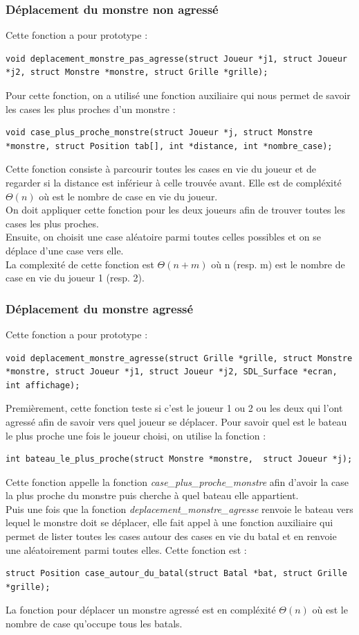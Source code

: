\subsubsection{Déplacement du monstre non agressé}
Cette fonction a pour prototype :
\begin{lstlisting}
void deplacement_monstre_pas_agresse(struct Joueur *j1, struct Joueur *j2, struct Monstre *monstre, struct Grille *grille);
\end{lstlisting}
Pour cette fonction, on a utilisé une fonction auxiliaire qui nous permet de savoir les cases les plus proches d'un monstre :
\begin{lstlisting}
void case_plus_proche_monstre(struct Joueur *j, struct Monstre *monstre, struct Position tab[], int *distance, int *nombre_case);
\end{lstlisting}
Cette fonction consiste à parcourir toutes les cases en vie du joueur et de regarder si la distance est inférieur à celle trouvée avant. Elle est de compléxité $\Theta(n)$ où est le nombre de case en vie du joueur.\\
On doit appliquer cette fonction pour les deux joueurs afin de trouver toutes les cases les plus proches.\\
Ensuite, on choisit une case aléatoire parmi toutes celles possibles et on se déplace d'une case vers elle.\\
La complexité de cette fonction est $\Theta(n + m)$ où n (resp. m) est le nombre de case en vie du joueur 1 (resp. 2). 
\subsubsection{Déplacement du monstre agressé}
Cette fonction a pour prototype :
\begin{lstlisting}
void deplacement_monstre_agresse(struct Grille *grille, struct Monstre *monstre, struct Joueur *j1, struct Joueur *j2, SDL_Surface *ecran, int affichage);
\end{lstlisting}
Premièrement, cette fonction teste si c'est le joueur 1 ou 2 ou les deux qui l'ont agressé afin de savoir vers quel joueur se déplacer. Pour savoir quel est le bateau le plus proche une fois le joueur choisi, on utilise la fonction : 
\begin{lstlisting}
int bateau_le_plus_proche(struct Monstre *monstre,  struct Joueur *j);
\end{lstlisting}
Cette fonction appelle la fonction {\textit{case\_plus\_proche\_monstre}} afin d'avoir la case la plus proche du monstre puis cherche à quel bateau elle appartient. \\
Puis une fois que la fonction {\textit{deplacement\_monstre\_agresse}} renvoie le bateau vers lequel le monstre doit se déplacer, elle fait appel à une fonction auxiliaire qui permet de lister toutes les cases autour des cases en vie du batal et en renvoie une aléatoirement parmi toutes elles. Cette fonction est :
\begin{lstlisting}
struct Position case_autour_du_batal(struct Batal *bat, struct Grille *grille);
\end{lstlisting}
La fonction pour déplacer un monstre agressé est en compléxité $\Theta(n)$ où est le nombre de case qu'occupe tous les batals.
